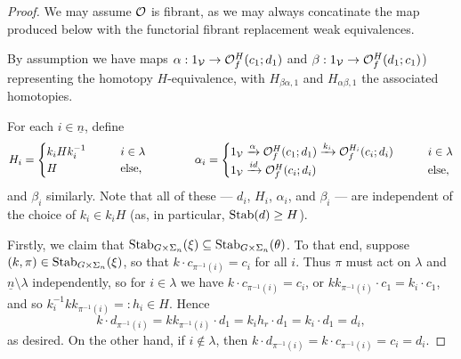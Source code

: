\documentclass[a4paper,10pt
,draft
]{article}%
\renewcommand{\1}{\ensuremath{\mathbb{id}}}
\begin{document}
\begin{proof}
      We may assume $\mathcal{O}$ is fibrant, as we may always concatinate the map produced below with the functorial fibrant replacement weak equivalences.
      
      By assumption we have maps
      $\alpha: 1_{\mathcal V} \to \mathcal{O}^H_f(c_1;d_1)$ and $\beta: 1_{\mathcal V} \to \mathcal{O}^H_f(d_1;c_1)$)
      representing the homotopy $H$-equivalence,
      with $H_{\beta\alpha,1}$ and $H_{\alpha\beta,1}$ the associated homotopies.
      
      For each $i \in \underline{n}$, define
      \begin{equation}
            \label{WEAKEQCOLORS_EQ}
            H_i =
            \begin{cases}
                  k_i H k_i^{-1} \qquad & i \in \lambda
                  \\
                  H & \mbox{else,}
            \end{cases}
            \qquad
            \qquad 
            \alpha_i =
            \begin{cases}
                  1_{\mathcal V} \xrightarrow{\alpha} \mathcal{O}^H_f(c_1;d_1) \xrightarrow{k_i} \mathcal{O}^{H_i}_f(c_i;d_i) \qquad & i \in \lambda
                  \\
                  1_{\mathcal V} \xrightarrow{id} \mathcal{O}^H_f(c_i;d_i) & \mbox{else},
            \end{cases}
      \end{equation}
      and $\beta_i$ similarly.
      Note that all of these --- $d_i$, $H_i$, $\alpha_i$, and $\beta_i$ --- are independent of the choice of $k_i\in k_i H$
      (as, in particular, $\mathrm{Stab}(d) \geq H$).

      Firstly, we claim that $\mathrm{Stab}_{G \times \Sigma_n}(\xi) \subseteq \mathrm{Stab}_{G \times \Sigma_n}(\theta)$.
      To that end, suppose $(k,\pi)\in \mathrm{Stab}_{G\times \Sigma_n}(\xi)$, so that $k \cdot c_{\pi^{-1}(i)} = c_i$ for all $i$.
      Thus $\pi$ must act on $\lambda$ and $\underline{n} \setminus \lambda$ independently,
      so for $i \in \lambda$ we have $k \cdot c_{\pi^{-1}(i)} = c_i$, or
      $k k_{\pi^{-1}(i)} \cdot c_1 = k_i \cdot c_1$, and so
      $k_i^{-1} k k_{\pi^{-1}(i)} =:h_i \in H$. Hence 
      \begin{equation}
            k \cdot d_{\pi^{-1}(i)} = k k_{\pi^{-1}(i)} \cdot d_1 = k_i h_r \cdot d_1 = k_i \cdot d_1 = d_i,
      \end{equation}
      as desired.
      On the other hand, if $i \not \in \lambda$, then
      $k \cdot d_{\pi^{-1}(i)} = k \cdot c_{\pi^{-1}(i)} = c_i = d_i$.
      

\end{proof}
\end{document}
